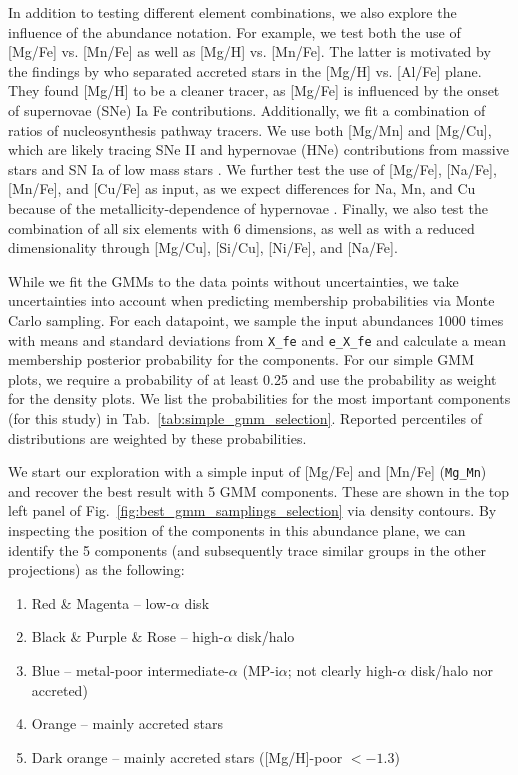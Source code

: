 \documentclass[fleqn,usenatbib]{mnras}
\begin{document}
In addition to testing different element combinations, we also explore the influence of the abundance notation. For example, we test both the use of [Mg/Fe] vs. [Mn/Fe] as well as [Mg/H] vs. [Mn/Fe]. The latter is motivated by the findings by \citet{Feuillet2021} who separated accreted stars in the [Mg/H] vs. [Al/Fe] plane. They found [Mg/H] to be a cleaner tracer, as [Mg/Fe] is influenced by the onset of supernovae (SNe) Ia Fe contributions. Additionally, we fit a combination of ratios of nucleosynthesis pathway tracers. We use both [Mg/Mn] and [Mg/Cu], which are likely tracing SNe II and hypernovae (HNe) contributions from massive stars and SN Ia of low mass stars \citep{Kobayashi2020}. We further test the use of [Mg/Fe], [Na/Fe], [Mn/Fe], and [Cu/Fe] as input, as we expect differences for Na, Mn, and Cu because of the metallicity-dependence of hypernovae \citep{Kobayashi2020}. Finally, we also test the combination of all six elements with 6 dimensions, as well as with a reduced dimensionality through [Mg/Cu], [Si/Cu], [Ni/Fe], and [Na/Fe].

While we fit the GMMs to the data points without uncertainties, we take uncertainties into account when predicting membership probabilities via Monte Carlo sampling. For each datapoint, we sample the input abundances 1000 times with means and standard deviations from \texttt{X\_fe} and \texttt{e\_X\_fe} and calculate a mean membership posterior probability for the components. For our simple GMM plots, we require a probability of at least 0.25 and use the probability as weight for the density plots. We list the probabilities for the most important components (for this study) in Tab.~\ref{tab:simple_gmm_selection}. Reported percentiles of distributions are weighted by these probabilities.

We start our exploration with a simple input of [Mg/Fe] and [Mn/Fe] (\texttt{Mg\_Mn}) and recover the best result with 5 GMM components. These are shown in the top left panel of Fig.~\ref{fig:best_gmm_samplings_selection} via density contours. By inspecting the position of the components in this abundance plane, we can identify the 5 components (and subsequently trace similar groups in the other projections) as the following:
\begin{enumerate}
\item Red \& Magenta -- low-$\alpha$ disk
\item Black \& Purple \& Rose -- high-$\alpha$ disk/halo
\item Blue -- metal-poor intermediate-$\alpha$ (MP-i$\alpha$; not clearly high-$\alpha$ disk/halo nor accreted)
\item Orange -- mainly accreted stars
 \item Dark orange -- mainly accreted stars ([Mg/H]-poor $< -1.3$)
\end{enumerate}
\end{document}
